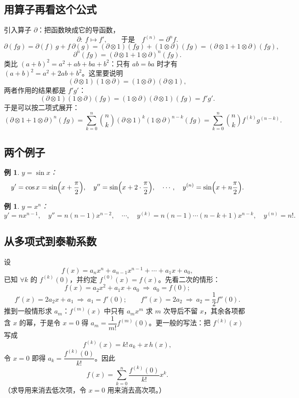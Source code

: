 \documentclass[UTF8,11pt]{ctexart}
\theoremstyle{cnthm}
\newtheorem{exa}[thm]{例}
\begin{document}
\subsection{用算子再看这个公式}

引入算子 $\partial$：把函数映成它的导函数，
\[
\partial:\ f\longmapsto f',\qquad\text{于是}\quad f^{(n)}=\partial^{n}f .
\]
\[
\partial(fg)=\partial(f)\,g+f\,\partial(g)
=(\partial\otimes1)(fg)+(1\otimes\partial)(fg)
=(\partial\otimes1+1\otimes\partial)(fg),
\]
\[
\partial^{n}(fg)=(\partial\otimes1+1\otimes\partial)^{n}(fg).
\]
类比 $(a+b)^{2}=a^{2}+ab+ba+b^{2}$：只有 $ab=ba$ 时才有 $(a+b)^{2}=a^{2}+2ab+b^{2}$。这里要说明
\[
(\partial\otimes1)(1\otimes\partial)=(1\otimes\partial)(\partial\otimes1),
\]
两者作用的结果都是 $f'g'$：
\[
(\partial\otimes1)(1\otimes\partial)(fg)=(1\otimes\partial)(\partial\otimes1)(fg)=f'g'.
\]
于是可以按二项式展开：
\[
(\partial\otimes1+1\otimes\partial)^{n}(fg)
=\sum_{k=0}^{n}\binom{n}{k}(\partial\otimes1)^{k}(1\otimes\partial)^{n-k}(fg)
=\sum_{k=0}^{n}\binom{n}{k}f^{(k)}g^{(n-k)} .
\]

\subsection{两个例子}

\begin{exa}
$y=\sin x$：
\[
y'=\cos x=\sin\Bigl(x+\frac{\pi}{2}\Bigr),\quad
y''=\sin\Bigl(x+2\cdot\frac{\pi}{2}\Bigr),\quad\cdots,\quad
y^{(n)}=\sin\Bigl(x+n\frac{\pi}{2}\Bigr).
\]
\end{exa}

\begin{exa}
$y=x^{n}$：
\[
y'=nx^{n-1},\quad y''=n(n-1)x^{n-2},\quad\cdots,\quad
y^{(k)}=n(n-1)\cdots(n-k+1)x^{n-k},\quad y^{(n)}=n! .
\]
\end{exa}

\subsection{从多项式到泰勒系数}

设
\[
f(x)=a_nx^{n}+a_{n-1}x^{n-1}+\cdots+a_1x+a_0 ,
\]
已知 $\forall k$ 的 $f^{(k)}(0)$，并约定 $f^{(0)}(x)=f(x)$。先看二次的情形：
\[
f(x)=a_2x^{2}+a_1x+a_0\ \Longrightarrow\ a_0=f(0);
\]
\[
f'(x)=2a_2x+a_1\ \Longrightarrow\ a_1=f'(0);\qquad
f''(x)=2a_2\ \Longrightarrow\ a_2=\frac12f''(0).
\]
推到一般情形求 $a_m$：$f^{(m)}(x)$ 中只有 $a_mx^{m}$ 求 $m$ 次导后不留 $x$，其余各项都含 $x$ 的幂，于是令 $x=0$ 得 $a_m=\dfrac{1}{m!}f^{(m)}(0)$。更一般的写法：把 $f^{(k)}(x)$ 写成
\[
f^{(k)}(x)=k!\,a_k+x\,h(x),
\]
令 $x=0$ 即得 $a_k=\dfrac{f^{(k)}(0)}{k!}$。因此
\[
f(x)=\sum_{k=0}^{n}\frac{f^{(k)}(0)}{k!}x^{k}.
\]
（求导用来消去低次项，令 $x=0$ 用来消去高次项。）
\end{document}
